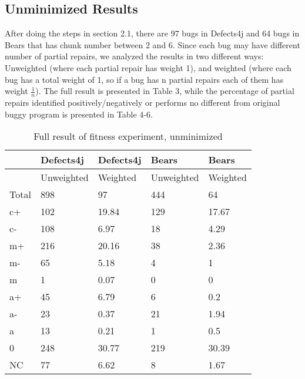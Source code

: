 \documentclass[sigconf, timestamp-false, anonymous=true]{acmart}
\begin{document}
\subsection{Unminimized Results}

After doing the steps in section 2.1, there are 97 bugs in Defects4j and 64 bugs in Bears that has chunk number between 2 and 6. Since each bug may have different number of partial repairs, we analyzed the results in two different ways: Unweighted (where each partial repair has weight 1), and weighted (where each bug has a total weight of 1, so if a bug has n partial repairs each of them has weight $\frac{1}{n}$). The full result is presented in Table 3, while the percentage of partial repairs identified positively/negatively or performs no different from original buggy program is presented in Table 4-6.

\begin{table}
{

\begin{tabular}{| l | l | l | l | l |} \hline
     & Defects4j & Defects4j & Bears & Bears  \\ \hline
     & Unweighted & Weighted & Unweighted & Weighted \\ \hline
    Total & 898 & 97 & 444 & 64 \\ \hline
    c+ & 102 & 19.84 & 129 & 17.67 \\
    c- & 108 & 6.97 & 18 & 4.29 \\
    m+ & 216 & 20.16 & 38 & 2.36 \\
    m- & 65 & 5.18 & 4 & 1 \\
    m~ & 1 & 0.07 & 0 & 0 \\
    a+ & 45 & 6.79 & 6 & 0.2 \\
    a- & 23 & 0.37 & 21 & 1.94 \\
    a~ & 13 & 0.21 & 1 & 0.5 \\
    0 & 248 & 30.77 & 219 & 30.39 \\
    NC & 77 & 6.62 & 8 & 1.67 \\
    \hline
    
    
    \end{tabular}
}
\caption{Full result of fitness experiment, unminimized}
\end{table}
    
\end{document}
